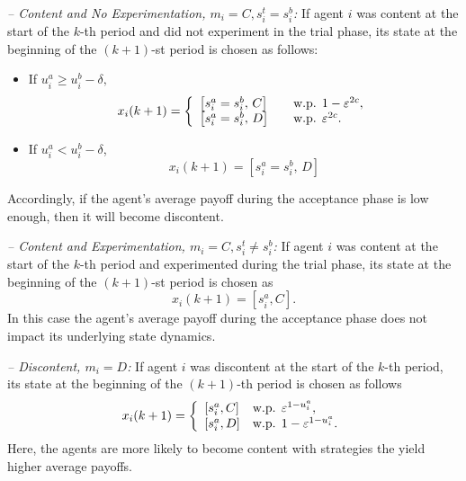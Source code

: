 \vspace{.2cm}

%
\noindent \emph{{-- Content and No Experimentation, $m_i = C, s_i^t = s_i^b$:}} 
%
If agent $i$ was content at the start of the $k$-th period and did not experiment in the trial phase, its state at the beginning of the $(k+1)$-st period is chosen as follows:
\begin{itemize}%
\item If $u_i^a \geq u_i^b - \delta,$
\begin{equation}\label{e:state trans1a}
x_i(k+1) = \left\{
\begin{array}{ll}
\left[s_i^a = s_i^b,\, C\right] &\quad\text{w.p. }1-\varepsilon^{2c}, \\
\left[s_i^a = s_i^b,\, D\right] &\quad\text{w.p. } \varepsilon^{2c}.
\end{array}\right.
\end{equation}
\item If $u_i^a < u_i^b - \delta$,
\begin{equation}\label{e:state trans1b}
x_i(k+1) = 
\left[s_i^a = s_i^b,\, D\right] 
\end{equation}
\end{itemize}
%
Accordingly, if the agent's average payoff during the acceptance phase is low enough, then it will become discontent.  

\vspace{.1cm}

%
\noindent \emph{{-- Content and Experimentation, $m_i = C, s_i^t \neq s_i^b$:}} 
%
If agent $i$ was content at the start of the $k$-th period and experimented during the trial phase, its state at the beginning of the $(k+1)$-st period is chosen as 
\begin{equation}\label{e:state trans2}
x_i(k+1) = \left[s_i^a, C\right].
\end{equation}
%
In this case the agent's average payoff during the acceptance phase does not impact its underlying state dynamics.  

\vspace{.1cm}

%
\noindent \emph{{-- Discontent, $m_i = D$:}} 
%
If agent $i$ was discontent at the start of the $k$-th period, its state at the beginning of the $(k+1)$-th period is chosen as follows
%
\begin{equation}\label{e:D state trans}
x_i(k+1) = \left\{
\begin{array}{ll}
\left[s_i^a, C\right] &\text{w.p. }  \varepsilon^{1-u_i^a}, \\
\left[s_i^a, D\right] &\text{w.p. } 1 - \varepsilon^{1-u_i^a}. 
\end{array}\right.
\end{equation}
%
Here, the agents are more likely to become content with strategies the yield higher average payoffs. 


